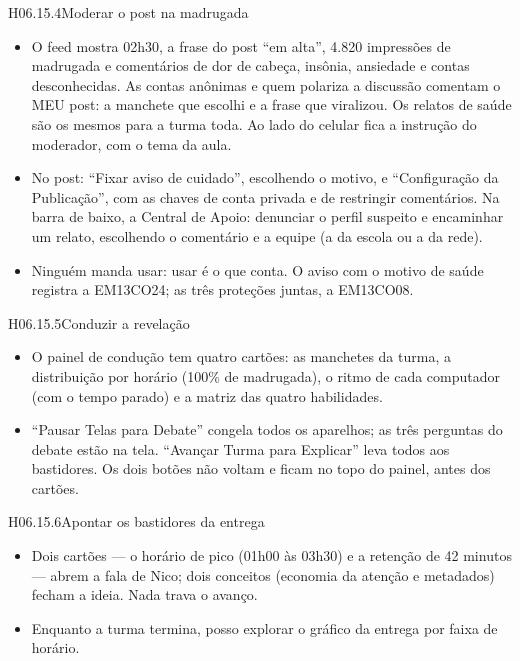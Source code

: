 \begin{historia}{H06.15.4}{Moderar o post na madrugada}{\pronto}
\aceite
\begin{itemize}
  \item O feed mostra 02h30, a frase do post \enquote{em alta}, 4.820
    impressões de madrugada e comentários de dor de cabeça, insônia,
    ansiedade e contas desconhecidas. As contas anônimas e quem polariza a
    discussão comentam o MEU post: a manchete que escolhi e a frase que
    viralizou. Os relatos de saúde são os mesmos para a turma toda. Ao lado
    do celular fica a instrução do moderador, com o tema da aula.
  \item No post: \enquote{Fixar aviso de cuidado}, escolhendo o motivo, e
    \enquote{Configuração da Publicação}, com as chaves de conta privada e de
    restringir comentários. Na barra de baixo, a Central de Apoio: denunciar
    o perfil suspeito e encaminhar um relato, escolhendo o comentário e a
    equipe (a da escola ou a da rede).
  \item Ninguém manda usar: usar é o que conta. O aviso com o motivo de saúde
    registra a EM13CO24; as três proteções juntas, a EM13CO08.
\end{itemize}
\end{historia}

\begin{historia}{H06.15.5}{Conduzir a revelação}{\pronto}
\aceite
\begin{itemize}
  \item O painel de condução tem quatro cartões: as manchetes da turma, a
    distribuição por horário (100\% de madrugada), o ritmo de cada computador
    (com o tempo parado) e a matriz das quatro habilidades.
  \item \enquote{Pausar Telas para Debate} congela todos os aparelhos; as três
    perguntas do debate estão na tela. \enquote{Avançar Turma para Explicar}
    leva todos aos bastidores. Os dois botões não voltam e ficam no topo do
    painel, antes dos cartões.
\end{itemize}
\end{historia}

\begin{historia}{H06.15.6}{Apontar os bastidores da entrega}{\pronto}
\aceite
\begin{itemize}
  \item Dois cartões --- o horário de pico (01h00 às 03h30) e a retenção de 42
    minutos --- abrem a fala de Nico; dois conceitos (economia da atenção e
    metadados) fecham a ideia. Nada trava o avanço.
  \item Enquanto a turma termina, posso explorar o gráfico da entrega por
    faixa de horário.
\end{itemize}
\end{historia}

